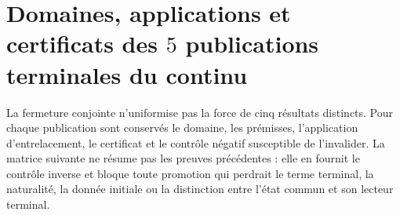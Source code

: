 \chapter{Domaines, applications et certificats des \(5\) publications terminales du continu}
\label{chap:hmt83-falsadores-clausuras}

La fermeture conjointe n’uniformise pas la force de cinq résultats distincts. Pour chaque publication sont conservés le domaine, les prémisses, l’application d’entrelacement, le certificat et le contrôle négatif susceptible de l’invalider. La matrice suivante ne résume pas les preuves précédentes : elle en fournit le contrôle inverse et bloque toute promotion qui perdrait le terme terminal, la naturalité, la donnée initiale ou la distinction entre l’état commun et son lecteur terminal.


